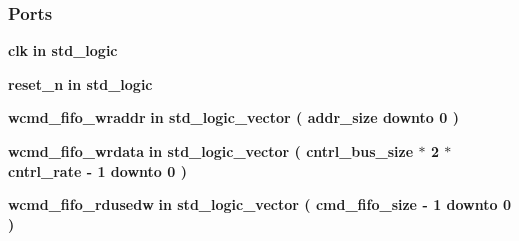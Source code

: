 \subsubsection*{Ports}
 \begin{DoxyCompactItemize}
\item 
{\bf clk}  {\bfseries {\bfseries \textcolor{keywordflow}{in}\textcolor{vhdlchar}{ }}} {\bfseries \textcolor{comment}{std\+\_\+logic}\textcolor{vhdlchar}{ }} 
\item 
{\bf reset\+\_\+n}  {\bfseries {\bfseries \textcolor{keywordflow}{in}\textcolor{vhdlchar}{ }}} {\bfseries \textcolor{comment}{std\+\_\+logic}\textcolor{vhdlchar}{ }} 
\item 
{\bf wcmd\+\_\+fifo\+\_\+wraddr}  {\bfseries {\bfseries \textcolor{keywordflow}{in}\textcolor{vhdlchar}{ }}} {\bfseries \textcolor{comment}{std\+\_\+logic\+\_\+vector}\textcolor{vhdlchar}{ }\textcolor{vhdlchar}{(}\textcolor{vhdlchar}{ }\textcolor{vhdlchar}{ }\textcolor{vhdlchar}{ }\textcolor{vhdlchar}{ }{\bfseries {\bf addr\+\_\+size}} \textcolor{vhdlchar}{ }\textcolor{keywordflow}{downto}\textcolor{vhdlchar}{ }\textcolor{vhdlchar}{ } \textcolor{vhdldigit}{0} \textcolor{vhdlchar}{ }\textcolor{vhdlchar}{)}\textcolor{vhdlchar}{ }} 
\item 
{\bf wcmd\+\_\+fifo\+\_\+wrdata}  {\bfseries {\bfseries \textcolor{keywordflow}{in}\textcolor{vhdlchar}{ }}} {\bfseries \textcolor{comment}{std\+\_\+logic\+\_\+vector}\textcolor{vhdlchar}{ }\textcolor{vhdlchar}{(}\textcolor{vhdlchar}{ }\textcolor{vhdlchar}{ }\textcolor{vhdlchar}{ }\textcolor{vhdlchar}{ }{\bfseries {\bf cntrl\+\_\+bus\+\_\+size}} \textcolor{vhdlchar}{$\ast$}\textcolor{vhdlchar}{ } \textcolor{vhdldigit}{2} \textcolor{vhdlchar}{$\ast$}\textcolor{vhdlchar}{ }\textcolor{vhdlchar}{ }\textcolor{vhdlchar}{ }{\bfseries {\bf cntrl\+\_\+rate}} \textcolor{vhdlchar}{-\/}\textcolor{vhdlchar}{ } \textcolor{vhdldigit}{1} \textcolor{vhdlchar}{ }\textcolor{keywordflow}{downto}\textcolor{vhdlchar}{ }\textcolor{vhdlchar}{ } \textcolor{vhdldigit}{0} \textcolor{vhdlchar}{ }\textcolor{vhdlchar}{)}\textcolor{vhdlchar}{ }} 
\item 
{\bf wcmd\+\_\+fifo\+\_\+rdusedw}  {\bfseries {\bfseries \textcolor{keywordflow}{in}\textcolor{vhdlchar}{ }}} {\bfseries \textcolor{comment}{std\+\_\+logic\+\_\+vector}\textcolor{vhdlchar}{ }\textcolor{vhdlchar}{(}\textcolor{vhdlchar}{ }\textcolor{vhdlchar}{ }\textcolor{vhdlchar}{ }\textcolor{vhdlchar}{ }{\bfseries {\bf cmd\+\_\+fifo\+\_\+size}} \textcolor{vhdlchar}{-\/}\textcolor{vhdlchar}{ } \textcolor{vhdldigit}{1} \textcolor{vhdlchar}{ }\textcolor{keywordflow}{downto}\textcolor{vhdlchar}{ }\textcolor{vhdlchar}{ } \textcolor{vhdldigit}{0} \textcolor{vhdlchar}{ }\textcolor{vhdlchar}{)}\textcolor{vhdlchar}{ }} 

\end{DoxyCompactItemize}
